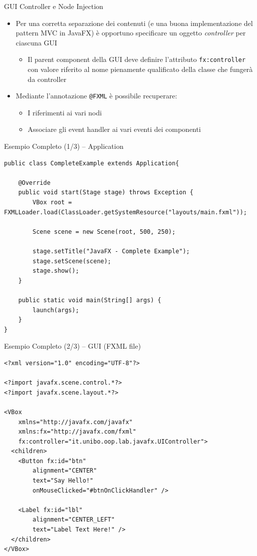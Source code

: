 \documentclass[xcolor=dvipsnames,presentation]{beamer}
\begin{document}
\begin{frame}{GUI Controller e Node Injection}
\begin{itemize}\itemsep20pt
\item Per una corretta separazione dei contenuti (e una buona implementazione del pattern MVC in JavaFX) è opportuno specificare un oggetto \emph{controller} per ciascuna GUI
\begin{itemize}
\item Il parent component della GUI deve definire l'attributo \texttt{fx:controller} con valore riferito al nome pienamente qualificato della classe che fungerà da controller
\end{itemize}
\item Mediante l'annotazione \texttt{@FXML} è possibile recuperare:
\begin{itemize}
\item I riferimenti ai vari nodi
\item Associare gli event handler ai vari eventi dei componenti
\end{itemize}
\end{itemize}
\end{frame}

\begin{frame}[fragile]{Esempio Completo (1/3) -- Application}
\begin{lstlisting}
public class CompleteExample extends Application{

	@Override
	public void start(Stage stage) throws Exception {
		VBox root = FXMLLoader.load(ClassLoader.getSystemResource("layouts/main.fxml"));

		Scene scene = new Scene(root, 500, 250);

		stage.setTitle("JavaFX - Complete Example");
		stage.setScene(scene);
		stage.show();
	}

	public static void main(String[] args) {
		launch(args);
	}
}
\end{lstlisting}
\end{frame}

\begin{frame}[fragile]{Esempio Completo (2/3) -- GUI (FXML file)}
\begin{lstlisting}
<?xml version="1.0" encoding="UTF-8"?>

<?import javafx.scene.control.*?>
<?import javafx.scene.layout.*?>

<VBox
    xmlns="http://javafx.com/javafx"
    xmlns:fx="http://javafx.com/fxml"
	fx:controller="it.unibo.oop.lab.javafx.UIController">
  <children>
    <Button fx:id="btn"
    	alignment="CENTER"
    	text="Say Hello!"
    	onMouseClicked="#btnOnClickHandler" />

    <Label fx:id="lbl"
    	alignment="CENTER_LEFT"
    	text="Label Text Here!" />
  </children>
</VBox>
\end{lstlisting}
\end{frame}
\end{document}
